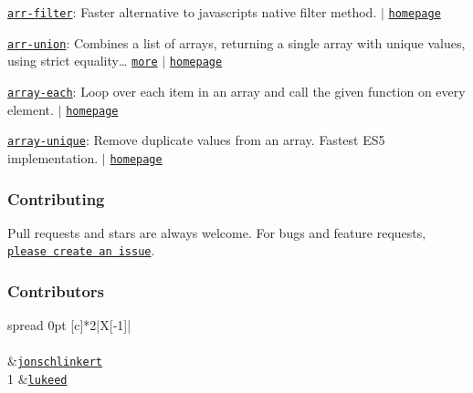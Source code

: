 \begin{DoxyItemize}
\item \href{https://www.npmjs.com/package/arr-filter}{\tt arr-\/filter}\+: Faster alternative to javascript\textquotesingle{}s native filter method. $\vert$ \href{https://github.com/jonschlinkert/arr-filter}{\tt homepage}
\item \href{https://www.npmjs.com/package/arr-union}{\tt arr-\/union}\+: Combines a list of arrays, returning a single array with unique values, using strict equality… \href{https://github.com/jonschlinkert/arr-union}{\tt more} $\vert$ \href{https://github.com/jonschlinkert/arr-union}{\tt homepage}
\item \href{https://www.npmjs.com/package/array-each}{\tt array-\/each}\+: Loop over each item in an array and call the given function on every element. $\vert$ \href{https://github.com/jonschlinkert/array-each}{\tt homepage}
\item \href{https://www.npmjs.com/package/array-unique}{\tt array-\/unique}\+: Remove duplicate values from an array. Fastest E\+S5 implementation. $\vert$ \href{https://github.com/jonschlinkert/array-unique}{\tt homepage}
\end{DoxyItemize}

\subsubsection*{Contributing}

Pull requests and stars are always welcome. For bugs and feature requests, \href{../../issues/new}{\tt please create an issue}.

\subsubsection*{Contributors}

\tabulinesep=1mm
\begin{longtabu} spread 0pt [c]{*{2}{|X[-1]}|}
\hline
\rowcolor{\tableheadbgcolor}\\
\endfirsthead
\hline
\endfoot
\hline
\rowcolor{\tableheadbgcolor}\\
  &\href{https://github.com/jonschlinkert}{\tt jonschlinkert}   \\
1  &\href{https://github.com/lukeed}{\tt lukeed}   \\
\end{longtabu}


